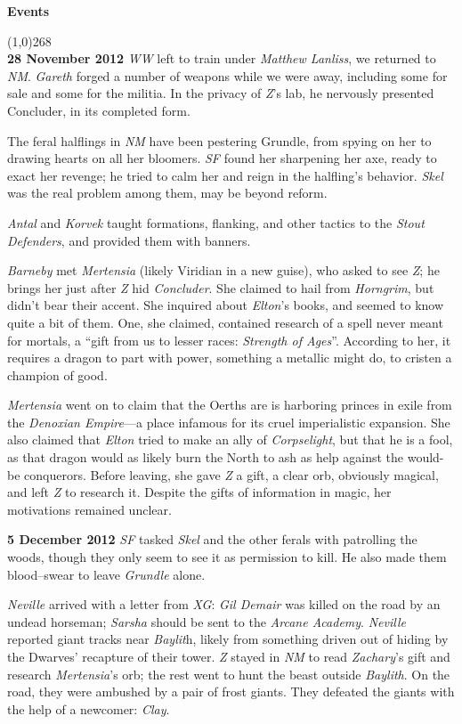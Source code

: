 \documentclass[letterpaper]{article}
\newcommand{\colline}{\line(1,0){268} \\}
\newcommand{\e}[1]{\emph{#1}}
\newcommand{\B}[1]{\textbf{#1}}
\newenvironment{notesection}[1]
{ {\huge \B{#1}} \par
\vspace{-0.75em}
\colline
\begingroup\fontsize{9pt}{12pt}\selectfont}
{\endgroup}
\begin{document}
\begin{notesection}{Events}
\B{28 November 2012} \e{WW} left to train under \e{Matthew Lanliss}, we returned to \e{NM}. \e{Gareth} forged a number of weapons while we were away, including some for sale and some for the militia. In the privacy of \e{Z}'s lab, he nervously presented Concluder, in its completed form.

The feral halflings in \e{NM} have been pestering Grundle, from spying on her to drawing hearts on all her bloomers. \e{SF} found her sharpening her axe, ready to exact her revenge; he tried to calm her and reign in the halfling's behavior. \e{Skel} was the real problem among them, may be beyond reform.

\e{Antal} and \e{Korvek} taught formations, flanking, and other tactics to the \e{Stout Defenders}, and provided them with banners.

\e{Barneby} met \e{Mertensia} (likely Viridian in a new guise), who asked to see \e{Z}; he brings her just after \e{Z} hid \e{Concluder}. She claimed to hail from \e{Horngrim}, but didn't bear their accent. She inquired about \e{Elton}'s books, and seemed to know quite a bit of them. One, she claimed, contained research of a spell never meant for mortals, a ``gift from us to lesser races: \e{Strength of Ages}''. According to her, it requires a dragon to part with power, something a metallic might do, to cristen a champion of good.

\e{Mertensia} went on to claim that the Oerths are is harboring princes in exile from the \e{Denoxian Empire}---a place infamous for its cruel imperialistic expansion.  She also claimed that \e{Elton} tried to make an ally of \e{Corpselight}, but that he is a fool, as that dragon would as likely burn the North to ash as help against the would-be conquerors. Before leaving, she gave \e{Z} a gift, a clear orb, obviously magical, and left \e{Z} to research it. Despite the gifts of information in magic, her motivations remained unclear.

\B{5 December 2012} \e{SF} tasked \e{Skel} and the other ferals with patrolling the woods, though they only seem to see it as permission to kill. He also made them blood--swear to leave \e{Grundle} alone.

\e{Neville} arrived with a letter from \e{XG}: \e{Gil Demair} was killed on the road by an undead horseman; \e{Sarsha} should be sent to the \e{Arcane Academy}. \e{Neville} reported giant tracks near \e{Baylit}h, likely from something driven out of hiding by the Dwarves' recapture of their tower.  \e{Z} stayed in \e{NM} to read \e{Zachary}'s gift and research \e{Mertensia}'s orb; the rest went to hunt the beast outside \e{Baylith}. On the road, they were ambushed by a pair of frost giants. They defeated the giants with the help of a newcomer: \e{Clay}.


\end{notesection}
\end{document}
